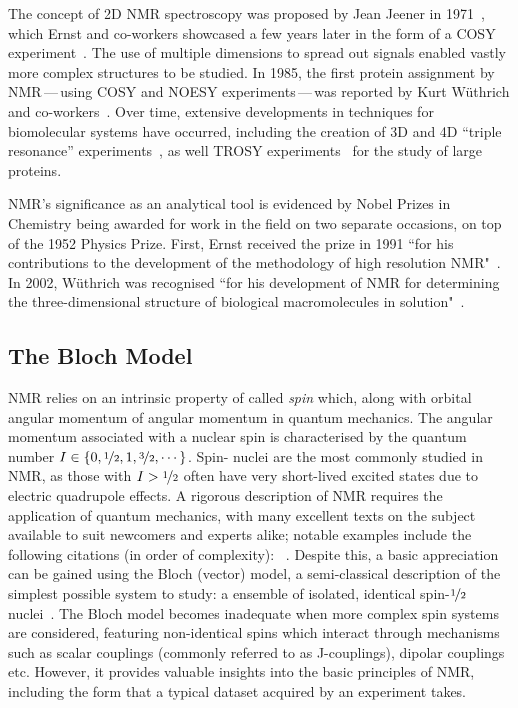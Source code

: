 The concept of \ac{2D} \ac{NMR} spectroscopy was proposed by Jean Jeener in
1971~\cite{Jeener1971, Jeener2016}, which Ernst and co-workers showcased a few
years later in the form of a \ac{COSY} experiment~\cite{Aue1976a}. The use of
multiple dimensions to spread out signals enabled vastly more complex
structures to be studied. In 1985, the first protein assignment by
\ac{NMR}\,---\,using \ac{COSY} and \ac{NOESY} experiments\,---\,was reported
by Kurt W\"uthrich and co-workers~\cite{Williamson1985}. Over time, extensive
developments in techniques for biomolecular systems have occurred, including
the creation of 3D and 4D ``triple resonance'' experiments~\cite{Marion1989,
Kay1990}, as well \ac{TROSY} experiments~\cite{Pervushin1997} for the study of
large proteins.

\ac{NMR}'s significance as an analytical tool is evidenced by Nobel Prizes in
Chemistry being awarded for work in the field on two separate occasions, on top
of the 1952 Physics Prize. First,
Ernst received the prize in 1991 ``for his contributions to the development of
the methodology of high resolution \acl{NMR}"~\cite{Ernst1992}. In 2002,
W\"uthrich was recognised ``for his development of \acl{NMR} for determining
the three-dimensional structure of biological macromolecules in
solution"~\cite{Wuthrich2003}.

\subsection{The Bloch Model}

\ac{NMR} relies on an intrinsic property of  called \textit{spin}
which, along with orbital angular momentum  of angular momentum in quantum mechanics.
The angular momentum associated with a nuclear spin is characterised by the
quantum number $I \in \lbrace 0, \nicefrac{1}{2}, 1, \nicefrac{3}{2}, \cdots
\rbrace$. Spin-
nuclei are the most commonly studied in \ac{NMR}, as those with $I >
\nicefrac{1}{2}$ often have very short-lived excited states due to electric
quadrupole effects. A rigorous description of \ac{NMR} requires the application
of quantum mechanics, with many excellent texts on the subject available to
suit newcomers and experts alike; notable examples include the
following citations (in order of complexity):
~\cite{Hore2015,Levitt2007,Cavanagh2007,Goldman1988,Abragam1961}.
Despite this, a basic
appreciation can be gained using the Bloch (vector) model, a semi-classical
description of the simplest possible system to study: a ensemble of
isolated, identical spin-$\nicefrac{1}{2}$ nuclei~\cite[Chapter 1]{Hore2015}.
The Bloch model becomes inadequate when more complex spin systems are
considered, featuring non-identical spins which interact through mechanisms
such as scalar couplings (commonly referred to as J-couplings), dipolar
couplings etc. However, it provides valuable insights into the basic principles
of \ac{NMR}, including the form that a typical dataset acquired by an
experiment takes.

